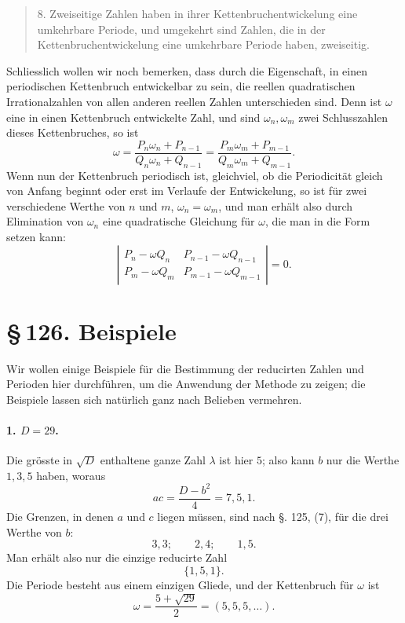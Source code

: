 \documentclass[11pt]{article}
\providecommand{\sect}[2]{\section*{\S\,#1. #2}}
\begin{document}
\begin{quote}
8. Zweiseitige Zahlen haben in ihrer Kettenbruchentwickelung eine umkehrbare Periode, und umgekehrt sind Zahlen, die in der Kettenbruchentwickelung eine umkehrbare Periode haben, zweiseitig.
\end{quote}

Schliesslich wollen wir noch bemerken, dass durch die Eigenschaft, in einen periodischen Kettenbruch entwickelbar zu sein, die reellen quadratischen Irrationalzahlen von allen anderen reellen Zahlen unterschieden sind. Denn ist $\omega$ eine in einen Kettenbruch entwickelte Zahl, und sind $\omega_n,\omega_m$ zwei Schlusszahlen dieses Kettenbruches, so ist
\[
        \omega=
\frac{P_n\omega_n+P_{n-1}}{Q_n\omega_n+Q_{n-1}}
=\frac{P_m\omega_m+P_{m-1}}{Q_m\omega_m+Q_{m-1}}.
\]
Wenn nun der Kettenbruch periodisch ist, gleichviel, ob die Periodicität gleich von Anfang beginnt oder erst im Verlaufe der Entwickelung, so ist für zwei verschiedene Werthe von $n$ und $m$, $\omega_n=\omega_m$, und man erhält also durch Elimination von $\omega_n$ eine quadratische Gleichung für $\omega$, die man in die Form setzen kann:
\[
        \left|
        \begin{array}{cc}
        P_n-\omega Q_n & P_{n-1}-\omega Q_{n-1}\\
        P_m-\omega Q_m & P_{m-1}-\omega Q_{m-1}
        \end{array}\right|=0.
\]

\sect{126}{Beispiele}

Wir wollen einige Beispiele für die Bestimmung der reducirten Zahlen und Perioden hier durchführen, um die Anwendung der Methode zu zeigen; die Beispiele lassen sich natürlich ganz nach Belieben vermehren.

\paragraph{1. $D=29$.}
Die grösste in $\sqrt D$ enthaltene ganze Zahl $\lambda$ ist hier $5$; also kann $b$ nur die Werthe $1,3,5$ haben, woraus
\[
        ac=\frac{D-b^2}{4}=7,5,1.
\]
Die Grenzen, in denen $a$ und $c$ liegen müssen, sind nach §. 125, (7), für die drei Werthe von $b$:
\[
        3,3;\qquad 2,4;\qquad 1,5.
\]
Man erhält also nur die einzige reducirte Zahl
\[
        \{1,5,1\}.
\]
Die Periode besteht aus einem einzigen Gliede, und der Kettenbruch für $\omega$ ist
\[
        \omega=\frac{5+\sqrt{29}}2=(5,5,5,\ldots).
\]
\end{document}
